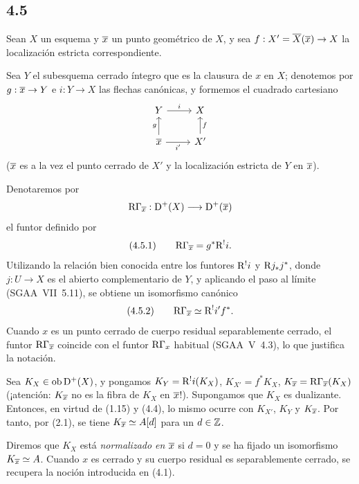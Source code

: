 \subsection*{4.5}
Sean $X$ un esquema y $\overline{x}$ un punto geométrico de $X$, y sea $f:X'=\overline{X}(\overline{x})\to X$ la localización estricta correspondiente.

Sea $Y$ el subesquema cerrado íntegro que es la clausura de $x$ en $X$; denotemos por $g:\overline{x}\to Y$ e $i:Y\to X$ las flechas canónicas, y formemos el cuadrado cartesiano
\[
\begin{tikzcd}
Y \arrow[r,"i"] & X \\
\ol{x} \arrow[u,"g"] \arrow[r,"i'"'] & X' \arrow[u,"f"']
\end{tikzcd}
\]
($\overline{x}$ es a la vez el punto cerrado de $X'$ y la localización estricta de $Y$ en $\overline{x}$).

Denotaremos por
\[
\mathrm{R}\Gamma_{\overline{x}}:\mathrm{D}^+(X)\longrightarrow \mathrm{D}^+(\overline{x})
\]
el funtor definido por
\[
(4.5.1)\qquad \mathrm{R}\Gamma_{\overline{x}}=g^*\mathrm{R}^{!}i.
\]
Utilizando la relación bien conocida entre los funtores $\mathrm{R}^{!}i$ y $\mathrm{R} j_*j^*$, donde $j:U\to X$ es el abierto complementario de $Y$, y aplicando el paso al límite (SGAA~VII~5.11), se obtiene un isomorfismo canónico
\[
(4.5.2)\qquad \mathrm{R}\Gamma_{\overline{x}}\simeq\mathrm{R}^{!}i' f^*.
\]
Cuando $x$ es un punto cerrado de cuerpo residual separablemente cerrado, el funtor $\mathrm{R}\Gamma_{\overline{x}}$ coincide con el funtor $\mathrm{R}\Gamma_x$ habitual (SGAA~V~4.3), lo que justifica la notación.

Sea $K_X\in\operatorname{ob}\mathrm{D}^+(X)$, y pongamos $K_Y=\mathrm{R}^{!}i(K_X)$, $K_{X'}=f^*K_X$, $K_{\overline{x}}=\mathrm{R}\Gamma_{\overline{x}}(K_X)$ (¡atención: $K_{\overline{x}}$ no es la fibra de $K_X$ en $\overline{x}$!). Supongamos que $K_X$ es dualizante. Entonces, en virtud de (1.15) y (4.4), lo mismo ocurre con $K_{X'}$, $K_Y$ y $K_{\overline{x}}$. Por tanto, por (2.1), se tiene $K_{\overline{x}}\simeq A[d]$ para un $d\in\mathbb{Z}$.

Diremos que $K_X$ está \emph{normalizado en $\overline{x}$} si $d=0$ y se ha fijado un isomorfismo $K_{\overline{x}}\simeq A$. Cuando $x$ es cerrado y su cuerpo residual es separablemente cerrado, se recupera la noción introducida en (4.1).

